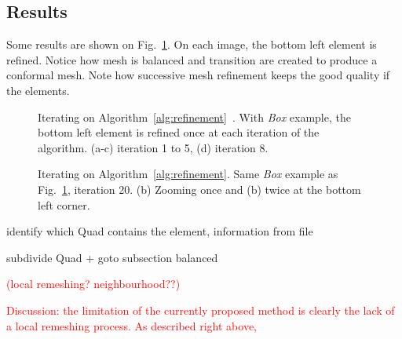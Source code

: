 \documentclass[10pt]{article}
\begin{document}
\subsection{Results}

Some results are shown on Fig.~\ref{fig:refiningbox}. On each image, the bottom left element is refined. Notice how mesh is balanced and transition are created to produce a conformal mesh. Note how successive mesh refinement keeps the good quality if the elements. 
\begin{figure}[htb]
\centering
 \caption{Iterating on Algorithm~\ref{alg:refinement}\ . With \textit{Box} example, the bottom left element is refined once at each iteration of the algorithm. (a-c) iteration 1 to 5, (d) iteration 8.}
\label{fig:refiningbox}
\end{figure}

\begin{figure}[htb]
\centering
 \caption{Iterating on Algorithm~\ref{alg:refinement}.  Same \textit{Box} example as Fig.~\ref{fig:refiningbox}, iteration 20. (b) Zooming once and (b) twice at the bottom left corner.}
\label{fig:refiningbox20}
\end{figure}



identify which Quad contains the element, information from file

subdivide Quad + goto subsection balanced

\textcolor{red}{
(local remeshing? neighbourhood??)
}

\textcolor{red}{
Discussion: the limitation of the currently proposed method is clearly the lack of a local remeshing process. As described right above, 
}


\end{document}
